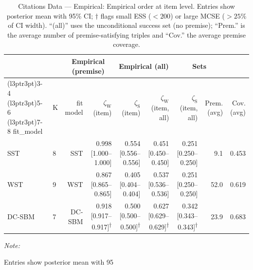 \begin{table}
\centering
\caption{\label{tab:tab:citations-data-empirical-emp-item}Citations Data — Empirical: Empirical order at item level. Entries show posterior mean with 95\% CI; $\dagger$ flags small ESS ($<200$) or large MCSE ($>25\%$ of CI width). “(all)” uses the unconditional success set (no premise); “Prem.” is the average number of premise-satisfying triples and “Cov.” the average premise coverage.}
\centering
\begin{threeparttable}
\begin{tabular}[t]{llrrrrrrr}
\toprule
\multicolumn{2}{c}{ } & \multicolumn{2}{c}{Empirical (premise)} & \multicolumn{2}{c}{Empirical (all)} & \multicolumn{2}{c}{Sets} \\
\cmidrule(l{3pt}r{3pt}){3-4} \cmidrule(l{3pt}r{3pt}){5-6} \cmidrule(l{3pt}r{3pt}){7-8}
fit_model & K & fit model & $\zeta_{\mathrm{W}}$ (item) & $\zeta_{\mathrm{S}}$ (item) & $\zeta_{\mathrm{W}}$ (item, all) & $\zeta_{\mathrm{S}}$ (item, all) & Prem. (avg) & Cov. (avg)\\
\midrule
SST & 8 & SST & 0.998 [1.000--1.000] & 0.554 [0.556--0.556] & 0.451 [0.450--0.450] & 0.251 [0.250--0.250] & 9.1 & 0.453\\
WST & 9 & WST & 0.867 [0.865--0.865] & 0.405 [0.404--0.404] & 0.537 [0.536--0.536] & 0.251 [0.250--0.250] & 52.0 & 0.619\\
DC-SBM & 7 & DC-SBM & 0.918 [0.917--0.917]\textsuperscript{$\dagger$} & 0.500 [0.500--0.500]\textsuperscript{$\dagger$} & 0.627 [0.629--0.629]\textsuperscript{$\dagger$} & 0.342 [0.343--0.343]\textsuperscript{$\dagger$} & 23.9 & 0.683\\
\bottomrule
\end{tabular}
\begin{tablenotes}
\item \textit{Note: } 
\item Entries show posterior mean with 95%
\end{tablenotes}
\end{threeparttable}
\end{table}